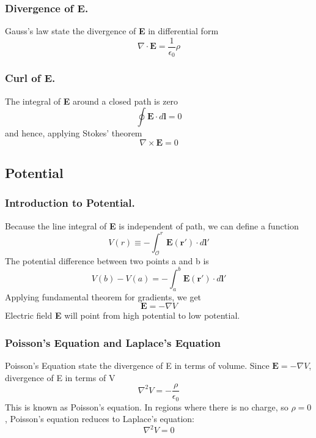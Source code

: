 \documentclass[../../../main.tex]{subfiles}
\begin{document}
\subsubsection{Divergence of E.} Gauss's law state the divergence of \textbf{E} in differential form
\begin{equation*}
    \nabla \cdot \mathbf{E}=\frac{1}{\epsilon_0}\rho
\end{equation*}

\subsubsection{Curl of E.} The integral of \textbf{E} around a closed path is zero 
\begin{equation*}
    \oint \mathbf{E} \cdot d\mathbf{l}  =0
\end{equation*}
and hence, applying Stokes' theorem
\begin{equation*}
    \nabla \times \mathbf{E}  =0
\end{equation*}


\subsection{Potential}
\subsubsection{Introduction to Potential.} Because the line integral of \textbf{E} is independent of path, we can define a function
\begin{equation*}
    V(r)\equiv -\int_{\mathcal{O}}^{r} \mathbf{E}(\mathbf{r'})\cdot d\mathbf{l'}
\end{equation*}
The potential difference between two points a and b is
\begin{equation*}
    V (b) - V (a)= -\int_{a}^{b} \mathbf{E}(\mathbf{r'})\cdot d\mathbf{l'}
\end{equation*}
Applying fundamental theorem for gradients, we get
\begin{equation*}
    \mathbf{E} =-\nabla V
\end{equation*}
Electric field \textbf{E} will point from high potential to low potential.

\subsubsection{Poisson's Equation and Laplace's Equation}
Poisson's Equation state the divergence of E in terms of volume. 
Since $   \mathbf{E} =-\nabla V$, divergence of E in terms of V
\begin{equation*}
    \nabla^2 V=-\frac{\rho}{\epsilon_0}
\end{equation*}
This is known as Poisson's equation. In regions where there is no charge, so
$\rho = 0$, Poisson's equation reduces to Laplace's equation:
\begin{equation*}
    \nabla^2 V=0
\end{equation*}
\end{document}
